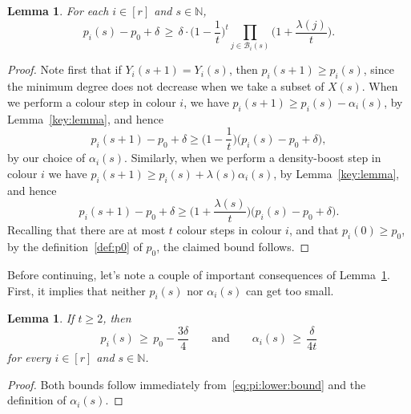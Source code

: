 \documentclass[12pt,reqno]{amsart}
\newtheorem{lemma}[theorem]{Lemma}
\theoremstyle{definition}
\theoremstyle{remark}
\newcommand\N{\mathbb{N}}
\newcommand\cB{\mathcal{B}}
\renewcommand{\ge}{\geqslant}
\def\N{\mathbb{N}}
\def\cB{\mathcal{B}}
\begin{document}
%
\begin{lemma}
	\label{lem:pi:lower:bound}
	For each \(i \in [r]\) and \(s \in \N\),
	\begin{equation}
		\label{eq:pi:lower:bound}
		p_i(s) - p_0 + \delta \, \ge \, \delta \cdot \bigg( 1 - \frac{1}{t} \bigg)^{t} \prod_{j \in \cB_i(s)} \bigg( 1 + \frac{\lambda(j)}{t} \bigg).
	\end{equation}
%
\end{lemma}
%
\begin{proof}
	Note first that if \(Y_i(s+1) = Y_i(s)\), then \(p_i(s+1) \ge p_i(s)\), since the minimum degree does not decrease when we take a subset of \(X(s)\). When we perform a colour step in colour \(i\),
	we have \(p_i(s+1) \ge p_i(s) - \alpha_i(s)\), by Lemma~\ref{key:lemma}, and hence
	\begin{equation*}
		p_i(s+1) - p_0 + \delta \ge \bigg( 1 - \frac{1}{t} \bigg) \big( p_i(s) - p_0 + \delta \big),
	\end{equation*}
	by our choice of \(\alpha_i(s)\). Similarly, when we perform a density-boost step in colour \(i\)
	we have \(p_i(s+1) \ge p_i(s) + \lambda(s) \alpha_i(s)\), by Lemma~\ref{key:lemma}, and hence
	\begin{equation*}
		p_i(s+1) - p_0 + \delta \ge \bigg( 1 + \frac{\lambda(s)}{t} \bigg) \big( p_i(s) - p_0 + \delta \big).
	\end{equation*}
	Recalling that there are at most \(t\) colour steps in colour \(i\), and that \(p_i(0) \ge p_0\), by the definition~\eqref{def:p0} of \(p_0\), the claimed bound follows.
\end{proof}
%

Before continuing, let's note a couple of important consequences of Lemma~\ref{lem:pi:lower:bound}. First, it implies that neither \(p_i(s)\) nor \(\alpha_i(s)\) can get too small.

%
\begin{lemma}
	\label{lem:pi:min}
	If\/ \(t \ge 2\), then
	\begin{equation*}
		p_i(s) \, \ge \, p_0 - \frac{3\delta}{4} \qquad \text{and} \qquad \alpha_i(s) \, \ge \, \frac{\delta}{4t}
	\end{equation*}
	for every \(i \in [r]\) and \(s \in \N\).
\end{lemma}
%
\begin{proof}
	Both bounds follow immediately from~\eqref{eq:pi:lower:bound} and the definition of \(\alpha_i(s)\).
\end{proof}
%
\end{document}
